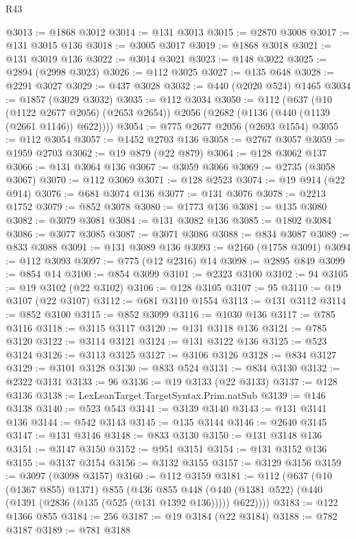 \begin{lexlean}{R43}
\begin{coremodule}
@3013 := @1868 @3012
@3014 := @131 @3013
@3015 := @2870 @3008
@3017 := @131 @3015 @136
@3018 := @3005 @3017
@3019 := @1868 @3018
@3021 := @131 @3019 @136
@3022 := @3014 @3021
@3023 := @148 @3022
@3025 := @2894 (@2998 @3023)
@3026 := @112 @3025
@3027 := @135 @648
@3028 := @2291 @3027
@3029 := @437 @3028
@3032 := @440 (@2020 @524) @1465
@3034 := @1857 (@3029 @3032)
@3035 := @112 @3034
@3050 := @112
    (@637
      (@10 (@1122 @2677 @2056) (@2653 @2654))
      @2056
      (@2682 (@1136 (@440 (@1139 (@2661 @1146)) @622))))
@3054 := @775 @2677 @2056 (@2693 @1554)
@3055 := @112 @3054
@3057 := @1452 @2703 @136
@3058 := @2767 @3057
@3059 := @1959 @2703
@3062 := @19 @879 (@22 @879)
@3064 := @128 @3062 @137
@3066 := @131 @3064 @136
@3067 := @3059 @3066
@3069 := @2735 (@3058 @3067)
@3070 := @112 @3069
@3071 := @128 @2523
@3074 := @19 @914 (@22 @914)
@3076 := @681 @3074 @136
@3077 := @131 @3076
@3078 := @2213 @1752
@3079 := @852 @3078
@3080 := @1773 @136
@3081 := @135 @3080
@3082 := @3079 @3081
@3084 := @131 @3082 @136
@3085 := @1802 @3084
@3086 := @3077 @3085
@3087 := @3071 @3086
@3088 := @834 @3087
@3089 := @833 @3088
@3091 := @131 @3089 @136
@3093 := @2160 (@1758 @3091)
@3094 := @112 @3093
@3097 := @775 (@12 @2316) @14
@3098 := @2895 @849
@3099 := @854 @14
@3100 := @854 @3099
@3101 := @2323 @3100
@3102 := 94
@3105 := @19 @3102 (@22 @3102)
@3106 := @128 @3105
@3107 := 95
@3110 := @19 @3107 (@22 @3107)
@3112 := @681 @3110 @1554
@3113 := @131 @3112
@3114 := @852 @3100
@3115 := @852 @3099
@3116 := @1030 @136
@3117 := @785 @3116
@3118 := @3115 @3117
@3120 := @131 @3118 @136
@3121 := @785 @3120
@3122 := @3114 @3121
@3124 := @131 @3122 @136
@3125 := @523 @3124
@3126 := @3113 @3125
@3127 := @3106 @3126
@3128 := @834 @3127
@3129 := @3101 @3128
@3130 := @833 @524
@3131 := @834 @3130
@3132 := @2322 @3131
@3133 := 96
@3136 := @19 @3133 (@22 @3133)
@3137 := @128 @3136
@3138 := LexLeanTarget.TargetSyntax.Prim.natSub
@3139 := @146 @3138
@3140 := @523 @543
@3141 := @3139 @3140
@3143 := @131 @3141 @136
@3144 := @542 @3143
@3145 := @135 @3144
@3146 := @2640 @3145
@3147 := @131 @3146
@3148 := @833 @3130
@3150 := @131 @3148 @136
@3151 := @3147 @3150
@3152 := @951 @3151
@3154 := @131 @3152 @136
@3155 := @3137 @3154
@3156 := @3132 @3155
@3157 := @3129 @3156
@3159 := @3097 (@3098 @3157)
@3160 := @112 @3159
@3181 := @112
    (@637
      (@10 (@1367 @855) @1371)
      @855
      (@436
        @855
        @448
        (@440 (@1381 @522) (@440 (@1391 (@2836 (@135 (@525 (@131 @1392 @136))))) @622))))
@3183 := @122 @1366 @855
@3184 := 256
@3187 := @19 @3184 (@22 @3184)
@3188 := @782 @3187
@3189 := @781 @3188

\end{coremodule}
\end{lexlean}
